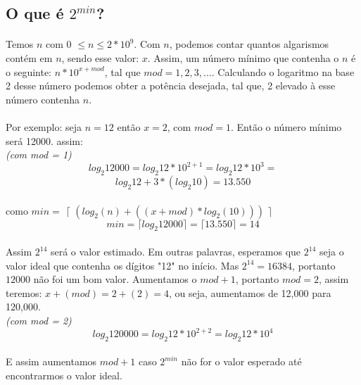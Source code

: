 \documentclass[10pt,a4paper]{article}
\begin{document}
	\subsection{O que é $2^{min}$?}
	\paragraph*{} Temos $n$ com 0 $ \leq n  \leq 2*10^9$. Com $n$, podemos contar quantos algarismos contém em $n$, sendo esse valor: $x$. Assim, um número mínimo que contenha o $n$ é o seguinte: $n*10^{x + mod}$, tal que $mod = 1, 2, 3, ...$. Calculando o logaritmo na base 2 desse número podemos obter a potência desejada, tal que, 2 elevado à esse número contenha $n$. 
	\paragraph*{} Por exemplo: seja $n = 12$ então $x = 2$, com $mod = 1$. Então o número mínimo será 12000. assim:\\{\it (com mod = 1)}
		\begin{equation*}
		log_2 12000 = log_2 12*10^{2+1} =  log_2 12*10^3 = 
		\end{equation*}	
		\begin{equation*}
		log_2 12 + 3*(log_2 10) = 13.550
		\end{equation*}
	\\ como $min = $ $\lceil$ $(log_2(n) + ( (x + mod) * log_2(10) ))$ $\rceil$
		\begin{equation*}
		min = \lceil log_2 12000 \rceil = \lceil 13.550 \rceil = 14
		\end{equation*}
		
	\paragraph*{} Assim $2^{14}$ será o valor estimado. Em outras palavras, esperamos que $2^{14}$ seja o valor ideal que contenha os dígitos "12" no início. Mas $2^{14} = 16384$, portanto $12000$ não foi um bom valor. Aumentamos o $mod + 1$, portanto $mod = 2$, assim teremos: $x + (mod) = 2 + (2) = 4$, ou seja, aumentamos de 12,000 para 120,000.\\{\it (com mod = 2)}
	\begin{equation*}
	log_2 120000 = log_2 12 * 10^{2+2} =  log_2 12 * 10^4 
	\end{equation*}	 
	\paragraph*{} E assim aumentamos $mod + 1$ caso $2^{min}$ não for o valor esperado até encontrarmos o valor ideal.
	
\end{document}
